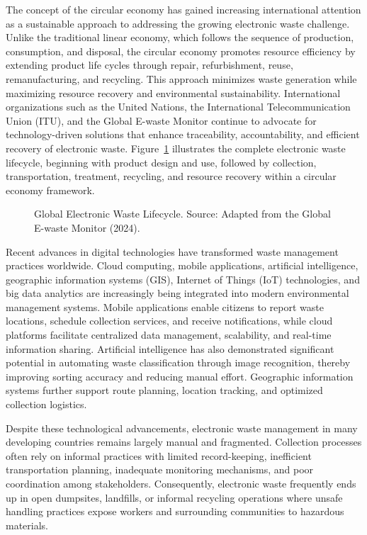 The concept of the circular economy has gained increasing international attention
as a sustainable approach to addressing the growing electronic waste challenge.
Unlike the traditional linear economy, which follows the sequence of production,
consumption, and disposal, the circular economy promotes resource efficiency by
extending product life cycles through repair, refurbishment, reuse, remanufacturing,
and recycling. This approach minimizes waste generation while maximizing resource
recovery and environmental sustainability. International organizations such as the
United Nations, the International Telecommunication Union (ITU), and the Global
E-waste Monitor continue to advocate for technology-driven solutions that enhance
traceability, accountability, and efficient recovery of electronic waste.
Figure~\ref{fig:ewaste-lifecycle} illustrates the complete electronic waste lifecycle,
beginning with product design and use, followed by collection, transportation,
treatment, recycling, and resource recovery within a circular economy framework.

\begin{figure}[H]
  \centering
  \caption{Global Electronic Waste Lifecycle. Source: Adapted from the Global E-waste Monitor (2024).}
  \label{fig:ewaste-lifecycle}
\end{figure}

Recent advances in digital technologies have transformed waste management
practices worldwide. Cloud computing, mobile applications, artificial intelligence,
geographic information systems (GIS), Internet of Things (IoT) technologies, and big
data analytics are increasingly being integrated into modern environmental
management systems. Mobile applications enable citizens to report waste locations,
schedule collection services, and receive notifications, while cloud platforms
facilitate centralized data management, scalability, and real-time information sharing.
Artificial intelligence has also demonstrated significant potential in automating waste
classification through image recognition, thereby improving sorting accuracy and
reducing manual effort. Geographic information systems further support route
planning, location tracking, and optimized collection logistics.

Despite these technological advancements, electronic waste management in many
developing countries remains largely manual and fragmented. Collection processes
often rely on informal practices with limited record-keeping, inefficient transportation
planning, inadequate monitoring mechanisms, and poor coordination among
stakeholders. Consequently, electronic waste frequently ends up in open dumpsites,
landfills, or informal recycling operations where unsafe handling practices expose
workers and surrounding communities to hazardous materials.

